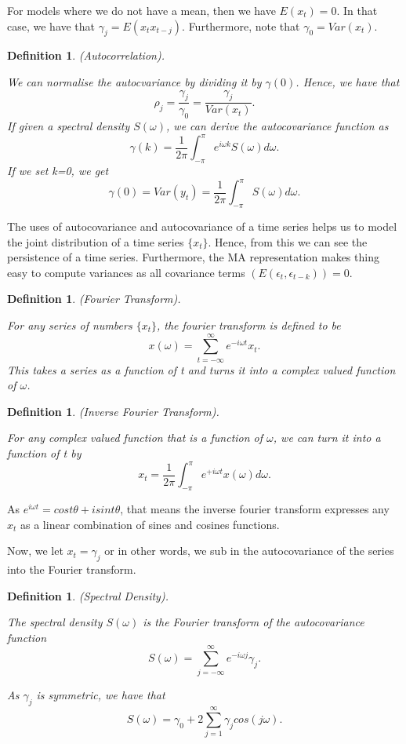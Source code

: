 \documentclass[twoside]{article}
\newtheorem{definition}[theorem]{Definition}
\begin{document}
For models where we do not have a mean, then we have $E(x_t) = 0$. In that case, we have that $\gamma_j = E(x_tx_{t-j})$. Furthermore, note that $\gamma_0 = Var(x_t)$.

\begin{definition}(Autocorrelation).

We can normalise the autocvariance by dividing it by $\gamma(0)$. Hence, we have that
$$
\rho_j = \frac{\gamma_j}{\gamma_0} = \frac{\gamma_j}{Var(x_t)}.
$$
If given a spectral density $S(\omega)$, we can derive the autocovariance function as
$$
\gamma(k) = \frac{1}{2\pi}\int_{-\pi}^{\pi}e^{i\omega k}S(\omega)d\omega.
$$
If we set k=0, we get
$$
\gamma(0) = Var(y_t) = \frac{1}{2\pi}\int_{-\pi}^{\pi}S(\omega)d\omega.
$$
\end{definition}

The uses of autocovariance and autocovariance of a time series helps us to model the joint distribution of a time series $\{x_t\}$. Hence, from this we can see the persistence of a time series. Furthermore, the MA representation makes thing easy to compute variances as all covariance terms $(E(\epsilon_t, \epsilon_{t-k})) = 0$.


\begin{definition}(Fourier Transform).

For any series of numbers $\{x_t\}$, the fourier transform is defined to be
$$
x(\omega) = \sum_{t=-\infty}^{\infty}e^{-i\omega t}x_t.
$$
This takes a series as a function of t and turns it into a complex valued function of $\omega$.
\end{definition}

\begin{definition}(Inverse Fourier Transform).

For any complex valued function that is a function of $\omega$, we can turn it into a function of t by
$$
x_t = \frac{1}{2\pi}\int_{-\pi}^{\pi}e^{+i\omega t}x(\omega)d\omega.
$$
\end{definition}

As $e^{i\omega t} = cos t\theta + isin t\theta$, that means the inverse fourier transform expresses any $x_t$ as a linear combination of sines and cosines functions.

Now, we let $x_t = \gamma_j$ or in other words, we sub in the autocovariance of the series into the Fourier transform. 
\begin{definition}(Spectral Density).

The spectral density $S(\omega)$ is the Fourier transform of the autocovariance function
$$
S(\omega) = \sum_{j=-\infty}^{\infty}e^{-i\omega j}\gamma_j.
$$

As $\gamma_j$ is symmetric, we have that
$$
S(\omega) = \gamma_0 + 2\sum_{j=1}^{\infty}\gamma_jcos(j\omega).
$$
\end{definition}
\end{document}
